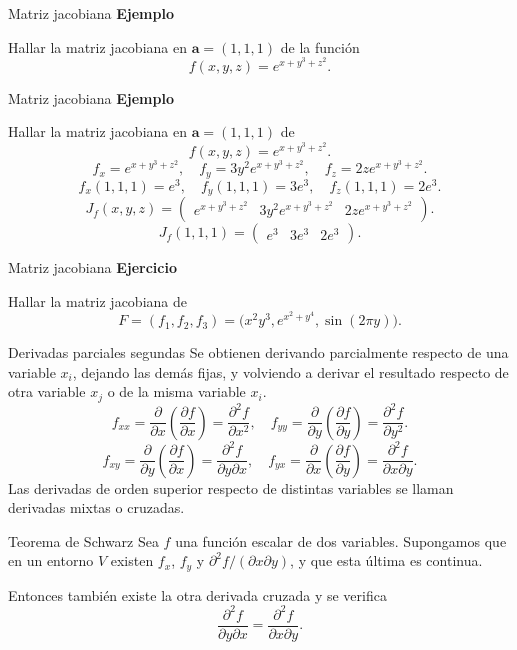 \documentclass[main.tex]{subfiles}
\begin{document}
\begin{frame}{Matriz jacobiana}
\textbf{Ejemplo}\par Hallar la matriz jacobiana en $\mathbf a=(1,1,1)$ de la función\[f(x,y,z)=e^{x+y^3+z^2}.\]
\end{frame}
\begin{frame}{Matriz jacobiana}
\small\textbf{Ejemplo}\par Hallar la matriz jacobiana en $\mathbf a=(1,1,1)$ de
\[f(x,y,z)=e^{x+y^3+z^2}.\]
\[f_x=e^{x+y^3+z^2},\quad f_y=3y^2e^{x+y^3+z^2},\quad f_z=2ze^{x+y^3+z^2}.\]
\[f_x(1,1,1)=e^3,\quad f_y(1,1,1)=3e^3,\quad f_z(1,1,1)=2e^3.\]
\[J_f(x,y,z)=\begin{pmatrix}e^{x+y^3+z^2}&3y^2e^{x+y^3+z^2}&2ze^{x+y^3+z^2}\end{pmatrix}.\]
\[J_f(1,1,1)=\begin{pmatrix}e^3&3e^3&2e^3\end{pmatrix}.\]
\end{frame}
\begin{frame}{Matriz jacobiana}
\textbf{Ejercicio}\par Hallar la matriz jacobiana de
\[F=(f_1,f_2,f_3)=\bigl(x^2y^3,e^{x^2+y^4},\sin(2\pi y)\bigr).\]
\end{frame}
\begin{frame}{Derivadas parciales segundas}
\small Se obtienen derivando parcialmente respecto de una variable $x_i$, dejando las demás fijas, y volviendo a derivar el resultado respecto de otra variable $x_j$ o de la misma variable $x_i$.
\[f_{xx}=\frac{\partial}{\partial x}\left(\frac{\partial f}{\partial x}\right)=\frac{\partial^2f}{\partial x^2},\quad
f_{yy}=\frac{\partial}{\partial y}\left(\frac{\partial f}{\partial y}\right)=\frac{\partial^2f}{\partial y^2}.\]
\[f_{xy}=\frac{\partial}{\partial y}\left(\frac{\partial f}{\partial x}\right)=\frac{\partial^2f}{\partial y\partial x},\quad
f_{yx}=\frac{\partial}{\partial x}\left(\frac{\partial f}{\partial y}\right)=\frac{\partial^2f}{\partial x\partial y}.\]
Las derivadas de orden superior respecto de distintas variables se llaman derivadas mixtas o cruzadas.
\end{frame}
\begin{frame}{Teorema de Schwarz}
Sea $f$ una función escalar de dos variables. Supongamos que en un entorno $V$ existen $f_x$, $f_y$ y $\partial^2f/(\partial x\partial y)$, y que esta última es continua.
\medskip

Entonces también existe la otra derivada cruzada y se verifica
\[\frac{\partial^2f}{\partial y\partial x}=\frac{\partial^2f}{\partial x\partial y}.\]
\end{frame}
\end{document}
